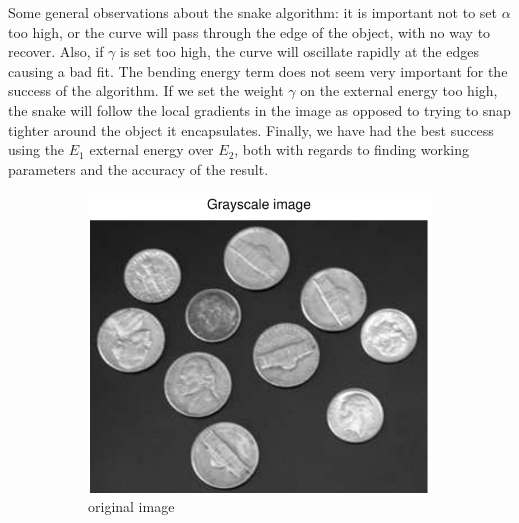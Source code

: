 \documentclass[11pt,a4paper]{article}
\begin{document}
Some general observations about the snake algorithm: it is important not to
set $\alpha$ too high, or the curve will pass through the edge of the object,
with no way to recover. Also, if $\gamma$ is set too high, the curve will
oscillate rapidly at the edges causing a bad fit. The bending energy term does
not seem very important for the success of the algorithm. If we set the weight
$\gamma$ on the external energy too high, the snake will follow the local
gradients in the image as opposed to trying to snap tighter around the object it
encapsulates. Finally, we have had
the best success using the $E_1$ external energy over $E_2$, both with regards
to finding working parameters and the accuracy of the result.
%
\begin{figure}[H]
    \centering
    \begin{subfigure}[t]{0.24\textwidth}
        \includegraphics[width=\textwidth]{src/images/coins_gradient_gray.pdf}
        \caption{original image}
        \label{fig:coins_original}
    \end{subfigure}
    \begin{subfigure}[t]{0.24\textwidth}

\end{subfigure}
\end{figure}
\end{document}

